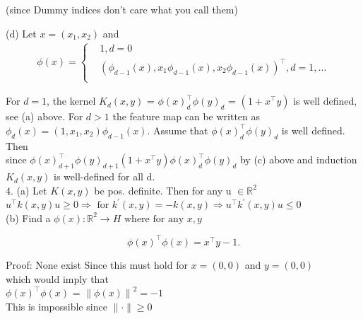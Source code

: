 \documentclass[18pt]{article}
\begin{document}
\begin{flushleft}
(since Dummy indices don't care what you call them)
\pagebreak

(d) Let $x=(x_1,x_2)$ and\\
    \begin{align}
    \phi(x)= 
    \left\{
        \begin{aligned}
             & 1, d=0\\
             & (\phi_{d-1}(x),x_1 \phi_{d-1}(x),x_2 \phi_{d-1}(x))^{\top}, d=1,\dots\\             
        \end{aligned}
    \right.    
    \end{align}

    


For $d = 1$, the kernel $K_d(x,y)$ = $\phi(x)_d^{\top}\phi(y)_d$ = $(1+x^{\top}y)$ is well defined,\\
see (a) above. For $d > 1$ the feature map can be written as $\phi_d(x) = (1, x_1,x_2) \phi_{d-1}(x)$.
Assume that $\phi(x)_d^{\top}\phi(y)_d$ is well defined. Then\\
since $\phi(x)_{d+1}^{\top}\phi(y)_{d+1}$$\left(1+x^{\top}y\right) \phi(x)_d^{\top}\phi(y)_d$ by (c) above and induction\\
$K_d(x,y)$ is well-defined for all d.\\
\vspace{.5cm}
4. (a) Let $K(x, y)$ be pos. definite. Then for any u $\in \mathbb{R}^{2}$\\
$u^{\top} k(x, y) u \geqslant 0\Rightarrow \text { for } k^{\prime}(x, y)=-k(x, y)\Rightarrow u^{\top} k^{\prime}(x, y) u \leq 0$\\
\vspace{.5cm}
(b) Find a $\phi(x): \mathbb{R}^{2} \rightarrow H \text{ where for any } x,y $

\[
\phi(x)^{\top}\phi(x)=x^{\top} y-1 .
\]

Proof: None exist Since this must hold for \(x=(0,0)\) and \(y=(0,0)\)\\
which would imply that\\
\newcommand{\norm}[1]{\left \lVert #1 \right \rVert}
\hspace{4.2cm} $\phi(x)^{\top} \phi(x)$ = $\norm{\phi(x)}^2=-1$\\
\vspace{.5cm}
This is impossible since $\|\cdot\| \geqslant 0$
\end{flushleft}
\end{document}
